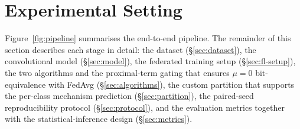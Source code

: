 \documentclass[11pt,a4paper]{article}
\begin{document}
\section{Experimental Setting}

Figure~\ref{fig:pipeline} summarises the end-to-end pipeline. The
remainder of this section describes each stage in detail: the dataset
(\S\ref{sec:dataset}), the convolutional model (\S\ref{sec:model}),
the federated training setup (\S\ref{sec:fl-setup}), the
two algorithms and the proximal-term gating that ensures
$\mu = 0$ bit-equivalence with FedAvg (\S\ref{sec:algorithms}), the
custom partition that supports the per-class mechanism prediction
(\S\ref{sec:partition}), the paired-seed reproducibility protocol
(\S\ref{sec:protocol}), and the evaluation metrics together with the
statistical-inference design (\S\ref{sec:metrics}).
\end{document}
